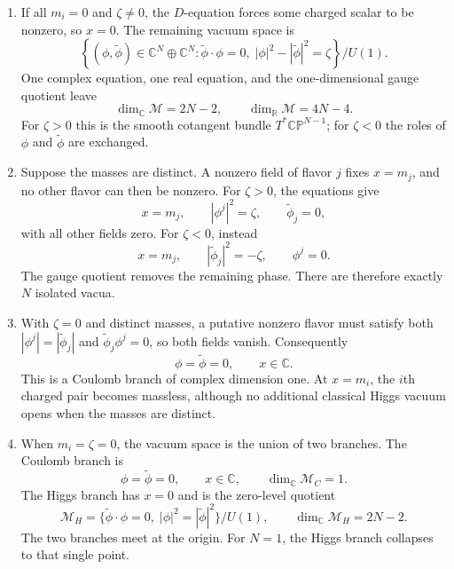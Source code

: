 \begin{enumerate}
  \begin{enumerate}
    \item[(i)] If all \(m_i=0\) and \(\zeta\ne0\), the \(D\)-equation forces
      some charged scalar to be nonzero, so \(x=0\).  The remaining vacuum
      space is
      \[
        \left\{(\phi,\widetilde\phi)\in
           \mathbb C^N\oplus\mathbb C^N:
           \widetilde\phi\cdot\phi=0,\;
           |\phi|^2-|\widetilde\phi|^2=\zeta\right\}\big/U(1).
      \]
      One complex equation, one real equation, and the one-dimensional
      gauge quotient leave
      \[
        \dim_{\mathbb C}\mathcal M=2N-2,\qquad
        \dim_{\mathbb R}\mathcal M=4N-4.
      \]
      For \(\zeta>0\) this is the smooth cotangent bundle
      \(T^*\mathbb{CP}^{N-1}\); for \(\zeta<0\) the roles of
      \(\phi\) and \(\widetilde\phi\) are exchanged.

    \item[(ii)] Suppose the masses are distinct.  A nonzero field of flavor
      \(j\) fixes \(x=m_j\), and no other flavor can then be nonzero.  For
      \(\zeta>0\), the equations give
      \[
        x=m_j,\qquad |\phi^j|^2=\zeta,\qquad
        \widetilde\phi_j=0,
      \]
      with all other fields zero.  For \(\zeta<0\), instead
      \[
        x=m_j,\qquad |\widetilde\phi_j|^2=-\zeta,\qquad
        \phi^j=0.
      \]
      The gauge quotient removes the remaining phase.  There are therefore
      exactly \(N\) isolated vacua.

    \item[(iii)] With \(\zeta=0\) and distinct masses, a putative nonzero
      flavor must satisfy both
      \(|\phi^j|=|\widetilde\phi_j|\) and
      \(\widetilde\phi_j\phi^j=0\), so both fields vanish.  Consequently
      \[
        \phi=\widetilde\phi=0,\qquad x\in\mathbb C.
      \]
      This is a Coulomb branch of complex dimension one.  At
      \(x=m_i\), the \(i\)th charged pair becomes massless, although no
      additional classical Higgs vacuum opens when the masses are distinct.

    \item[(iv)] When \(m_i=\zeta=0\), the vacuum space is the union of two
      branches.  The Coulomb branch is
      \[
        \phi=\widetilde\phi=0,\qquad x\in\mathbb C,
        \qquad \dim_{\mathbb C}\mathcal M_C=1.
      \]
      The Higgs branch has \(x=0\) and is the zero-level quotient
      \[
        \mathcal M_H=
        \{\widetilde\phi\cdot\phi=0,\;
          |\phi|^2=|\widetilde\phi|^2\}/U(1),
        \qquad
        \dim_{\mathbb C}\mathcal M_H=2N-2.
      \]
      The two branches meet at the origin.  For \(N=1\), the Higgs branch
      collapses to that single point.
  \end{enumerate}


\end{enumerate}
